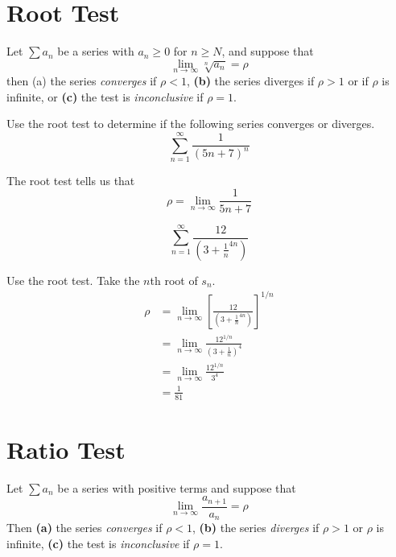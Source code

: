 \section{Root Test}

\begin{theorem}
  Let \(\sum a_n\) be a series with \( a_n \geq 0\) for \(n \geq N\), and
  suppose that
  \[ \lim_{n \to \infty} \sqrt[n]{a_n} = \rho \]
  then (a) the series \emph{converges} if \(\rho < 1 \), \textbf{(b)} the series
  diverges if \( \rho > 1\) or if \(\rho\) is infinite, or \textbf{(c)} the test
  is \emph{inconclusive} if \(\rho = 1\).
  \cite[p. 565]{thomas}
  \label{th:roottest}
\end{theorem}

\begin{ex}
  Use the root test to determine if the following series converges or diverges.
  \[ \sum_{n=1}^\infty \frac{1}{\left( 5n+7 \right)^n} \]
  \begin{sol}
    The root test tells us that
    \[ \rho = \lim_{n \to \infty} \frac{1}{5n+7} \]
  \end{sol}
\end{ex}
\begin{ex}
  \[ \sum_{n=1}^{\infty} \frac{12}{\left( 3+\frac{1}{n}^{4n} \right)} \]
  \begin{sol}
    Use the root test. Take the \(n\)th root of \(s_n\).
    \begin{align*}
      \rho &= \lim_{n \to \infty} \left[ \frac{12}{ \left( 3+\frac{1}{n}^{4n} \right) }\right]^{1/n} \\
      &= \lim_{n \to \infty} \frac{12^{1/n}}{\left( 3+\frac{1}{n} \right)^4}
      \\
      &= \lim_{n \to \infty} \frac{12^{1/n}}{3^4} \\
      &= \frac{1}{81}
    \end{align*}
  \end{sol}
\end{ex}


\section{Ratio Test}

\begin{theorem}\label{th:seriesratio}
  Let $\sum a_n$ be a series with positive terms and suppose that
  \[ \lim_{n \to \infty} \frac{a_{n+1}}{a_n}=\rho \]
  Then \textbf{(a)} the series \emph{converges} if $\rho < 1$, \textbf{(b)} the
  series \emph{diverges} if $\rho > 1$ or $\rho$ is infinite, \textbf{(c)} the
  test is \emph{inconclusive} if $\rho = 1$.
\end{theorem}

